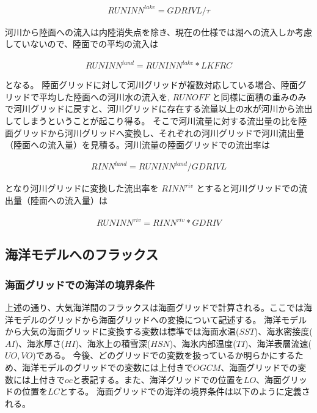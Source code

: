 \begin{eqnarray} RUNINN^{lake}=GDRIVL/\tau \end{eqnarray}

河川から陸面への流入は内陸消失点を除き、現在の仕様では湖への流入しか考慮していないので、陸面での平均の流入は

\begin{eqnarray} RUNINN^{land}=RUNINN^{lake}*LKFRC \end{eqnarray}

となる。
陸面グリッドに対して河川グリッドが複数対応している場合、陸面グリッドで平均した陸面への河川水の流入を,
\(RUNOFF\)
と同様に面積の重みのみで河川グリッドに戻すと、河川グリッドに存在する流量以上の水が河川から流出してしまうということが起こり得る。
そこで河川流量に対する流出量の比を陸面グリッドから河川グリッドへ変換し、それぞれの河川グリッドで河川流出量（陸面への流入量）を見積る。河川流量の陸面グリッドでの流出率は

\begin{eqnarray} RINN^{land}=RUNINN^{land}/GDRIVL \end{eqnarray}

となり河川グリッドに変換した流出率を \(RINN^{riv}\)
とすると河川グリッドでの流出量（陸面への流入量）は

\begin{eqnarray} RUNINN^{riv}=RINN^{riv}*GDRIV \end{eqnarray}

\hypertarget{ux6d77ux6d0bux30e2ux30c7ux30ebux3078ux306eux30d5ux30e9ux30c3ux30afux30b9}{%
\subsection{海洋モデルへのフラックス}\label{ux6d77ux6d0bux30e2ux30c7ux30ebux3078ux306eux30d5ux30e9ux30c3ux30afux30b9}}

\hypertarget{ux6d77ux9762ux30b0ux30eaux30c3ux30c9ux3067ux306eux6d77ux6d0bux306eux5883ux754cux6761ux4ef6}{%
\subsubsection{海面グリッドでの海洋の境界条件}\label{ux6d77ux9762ux30b0ux30eaux30c3ux30c9ux3067ux306eux6d77ux6d0bux306eux5883ux754cux6761ux4ef6}}

上述の通り、大気海洋間のフラックスは海面グリッドで計算される。ここでは海洋モデルのグリッドから海面グリッドへの変換について記述する。
海洋モデルから大気の海面グリッドに変換する変数は標準では海面水温(\(SST\))、海氷密接度(\(AI\))、海氷厚さ(\(HI\))、海氷上の積雪深(\(HSN\))、海氷内部温度(\(TI\))、海洋表層流速(\(UO,VO\))である。
今後、どのグリッドでの変数を扱っているか明らかにするため、海洋モデルのグリッドでの変数には上付きで\(OGCM\)、海面グリッドでの変数には上付きで\(oc\)と表記する。また、海洋グリッドでの位置を\(LO\)、海面グリッドの位置を\(LC\)とする。
海面グリッドでの海洋の境界条件は以下のように定義される。

